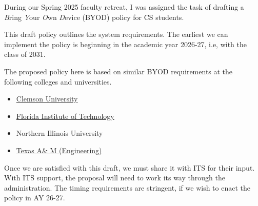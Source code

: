 \noindent 
During our Spring 2025 faculty retreat, I was assigned the task of drafting a \emph{B}ring \emph{Y}our \emph{O}wn \emph{D}evice (BYOD) policy for CS students. 

This draft policy outlines the system requirements. The earliest we can implement the policy is beginning in the academic year 2026-27, i.e, with the class of 2031.

The proposed policy here is based on similar BYOD requirements at the following colleges and universities.

\begin{itemize}
    \item \href{https://clemsonpub.cfmnetwork.com/B.aspx?BookId=11654&PageId=458060}{Clemson University}
    
    \item \href{https://www.fit.edu/policies/information-technology/policies/it-1015-bring-your-own-device-byod-policy/}{Florida Institute of Technology}
    
    \item Northern Illinois University

    \item \href{https://engineering.tamu.edu/academics/byod/index.html}{Texas A\& M (Engineering)}
\end{itemize}

Once we are satisfied with this draft, we must share it with ITS for their input. With ITS support, the proposal will need to work its way through the administration. The timing requirements are stringent, if we wish to enact the policy in AY 26-27.

\newpage